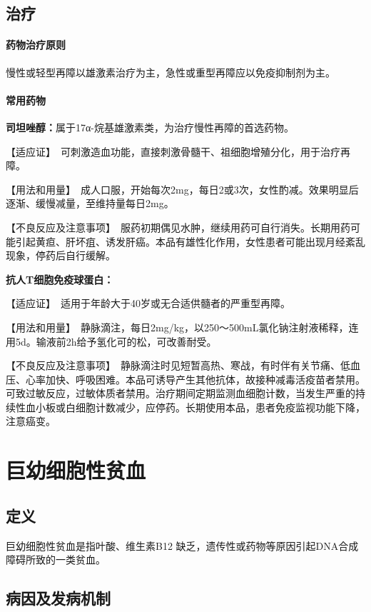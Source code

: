 \subsection{治疗}
\paragraph{药物治疗原则}

慢性或轻型再障以雄激素治疗为主，急性或重型再障应以免疫抑制剂为主。
\paragraph{常用药物}

\textbf{司坦唑醇：}属于17α-烷基雄激素类，为治疗慢性再障的首选药物。

【适应证】　可刺激造血功能，直接刺激骨髓干、祖细胞增殖分化，用于治疗再障。

【用法和用量】　成人口服，开始每次2mg，每日2或3次，女性酌减。效果明显后逐渐、缓慢减量，至维持量每日2mg。

【不良反应及注意事项】　服药初期偶见水肿，继续用药可自行消失。长期用药可能引起黄疸、肝坏疽、诱发肝癌。本品有雄性化作用，女性患者可能出现月经紊乱现象，停药后自行缓解。

\textbf{抗人T细胞免疫球蛋白：}

【适应证】　适用于年龄大于40岁或无合适供髓者的严重型再障。

【用法和用量】　静脉滴注，每日2mg/kg，以250～500mL氯化钠注射液稀释，连用5d。输液前2h给予氢化可的松，可改善耐受。

【不良反应及注意事项】　静脉滴注时见短暂高热、寒战，有时伴有关节痛、低血压、心率加快、呼吸困难。本品可诱导产生其他抗体，故接种减毒活疫苗者禁用。可致过敏反应，过敏体质者禁用。治疗期间定期监测血细胞计数，当发生严重的持续性血小板或白细胞计数减少，应停药。长期使用本品，患者免疫监视功能下降，注意癌变。

\section{巨幼细胞性贫血}

\subsection{定义}

巨幼细胞性贫血是指叶酸、维生素B{12}
缺乏，遗传性或药物等原因引起DNA合成障碍所致的一类贫血。

\subsection{病因及发病机制}

